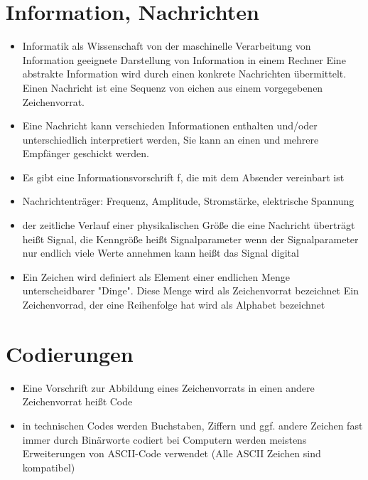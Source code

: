 \documentclass[10pt,a5paper]{article}
\author{Christian Böhm}
\begin{document}
\section{Information, Nachrichten}
\begin{itemize}
\item Informatik als Wissenschaft von der maschinelle Verarbeitung von Information
\subitem geeignete Darstellung von Information in einem Rechner
\subitem Eine abstrakte Information wird durch einen konkrete Nachrichten übermittelt. Einen Nachricht ist eine Sequenz von eichen aus einem vorgegebenen Zeichenvorrat.
\item Eine Nachricht kann verschieden Informationen enthalten und/oder unterschiedlich interpretiert werden, Sie kann an einen und mehrere Empfänger geschickt werden.
\item Es gibt eine Informationsvorschrift f, die mit dem Absender vereinbart ist
\item Nachrichtenträger:
\subitem Frequenz, Amplitude, Stromstärke, elektrische Spannung
\item der zeitliche Verlauf einer physikalischen Größe die eine Nachricht überträgt heißt Signal, die Kenngröße heißt Signalparameter
\subitem wenn der Signalparameter nur endlich viele Werte annehmen kann heißt das Signal digital
\item Ein Zeichen wird definiert als Element einer endlichen Menge unterscheidbarer "Dinge". Diese Menge wird als Zeichenvorrat bezeichnet
\subitem Ein Zeichenvorrad, der eine Reihenfolge hat wird als Alphabet bezeichnet
\end{itemize}
\section{Codierungen}
\begin{itemize}
\item Eine Vorschrift zur Abbildung eines Zeichenvorrats in einen andere Zeichenvorrat heißt Code
\item in technischen Codes werden Buchstaben, Ziffern und ggf. andere Zeichen fast immer durch Binärworte codiert
\subitem bei Computern werden meistens Erweiterungen von ASCII-Code verwendet (Alle ASCII Zeichen sind kompatibel)
\end{itemize}
\end{document}
